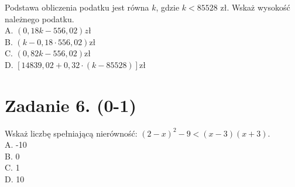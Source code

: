 \documentclass[10pt]{article}
\begin{document}
Podstawa obliczenia podatku jest równa \(k\), gdzie \(k<85528\) zł. Wskaż wysokość należnego podatku.\\
A. \((0,18 k-556,02) z ł\)\\
B. \((k-0,18 \cdot 556,02) \mathrm{zł}\)\\
C. \((0,82 k-556,02) \mathrm{zł}\)\\
D. \([14839,02+0,32 \cdot(k-85528)] \mathrm{zł}\)

\section*{Zadanie 6. (0-1)}
Wskaż liczbę spełniającą nierówność: \((2-x)^{2}-9<(x-3)(x+3)\).\\
A. -10\\
B. 0\\
C. 1\\
D. 10
\end{document}
